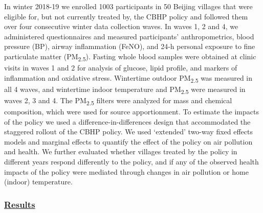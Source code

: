 \documentclass[
  letterpaper,
  DIV=11,
  numbers=noendperiod]{scrartcl}
\providecommand{\DIFadd}[1]{{\protect\color{blue}\underline{#1}}} %
\providecommand{\DIFaddbegin}{} %
\providecommand{\DIFaddend}{} %
\providecommand{\DIFdelbegin}{} %
\providecommand{\DIFdelend}{} %
\newcommand{\DIFscaledelfig}{0.5}
\newlength{\DIFdelgraphicswidth} %
\newlength{\DIFdelgraphicsheight} %
\newcommand{\DIFaddincludegraphics}[2][]{{\color{blue}\fbox{\DIFOincludegraphics[#1]{#2}}}} %
\newcommand{\DIFdelincludegraphics}[2][]{%
\sbox{\DIFdelgraphicsbox}{\DIFOincludegraphics[#1]{#2}}%
\settoboxwidth{\DIFdelgraphicswidth}{\DIFdelgraphicsbox} %
\settoboxtotalheight{\DIFdelgraphicsheight}{\DIFdelgraphicsbox} %
\scalebox{\DIFscaledelfig}{%
\parbox[b]{\DIFdelgraphicswidth}{\usebox{\DIFdelgraphicsbox}\\[-\baselineskip] \rule{\DIFdelgraphicswidth}{0em}}\llap{\resizebox{\DIFdelgraphicswidth}{\DIFdelgraphicsheight}{%
\setlength{\unitlength}{\DIFdelgraphicswidth}%
\begin{picture}(1,1)%
\thicklines\linethickness{2pt} %
{\color[rgb]{1,0,0}\put(0,0){\framebox(1,1){}}}%
{\color[rgb]{1,0,0}\put(0,0){\line( 1,1){1}}}%
{\color[rgb]{1,0,0}\put(0,1){\line(1,-1){1}}}%
\end{picture}%
}\hspace*{3pt}}} %
} %
\DeclareRobustCommand{\DIFaddbegin}{\DIFOaddbegin \let\includegraphics\DIFaddincludegraphics} %
\DeclareRobustCommand{\DIFaddend}{\DIFOaddend \let\includegraphics\DIFOincludegraphics} %
\DeclareRobustCommand{\DIFdelbegin}{\DIFOdelbegin \let\includegraphics\DIFdelincludegraphics} %
\DeclareRobustCommand{\DIFdelend}{\DIFOaddend \let\includegraphics\DIFOincludegraphics} %
\begin{document}
In winter 2018-19 we enrolled 1003 participants in 50 Beijing villages
that were eligible for, but not currently treated by, the CBHP policy
and followed them over four consecutive winter data collection waves. In
waves 1, 2 and 4, we administered questionnaires and measured
participants' anthropometrics, blood pressure (BP), airway inflammation
(FeNO), and 24-h personal exposure to fine particulate matter
(PM\textsubscript{2.5}). Fasting whole blood samples were obtained at
clinic visits in waves 1 and 2 for analysis of glucose, lipid profile,
and markers of inflammation and oxidative stress. Wintertime outdoor
PM\textsubscript{2.5} was measured in all 4 waves, and wintertime indoor
temperature and PM\textsubscript{2.5} were measured in waves 2, 3 and 4.
The PM\textsubscript{2.5} filters were analyzed for mass and chemical
composition, which were used for source apportionment. To estimate the
impacts of the policy we used a difference-in-differences design that
accommodated the staggered rollout of the CBHP policy. We used
`extended' two-way fixed effects models and marginal effects to quantify
the effect of the policy on air pollution and health. We further
evaluated whether villages treated by the policy in different years
respond differently to the policy, and if any of the observed health
impacts of the policy were mediated through changes in air pollution or
home (indoor) temperature.

\DIFdelbegin %
\DIFdelend \DIFaddbegin \subsubsection*{\DIFadd{Results}}\label{results}
\DIFaddend 
\end{document}
